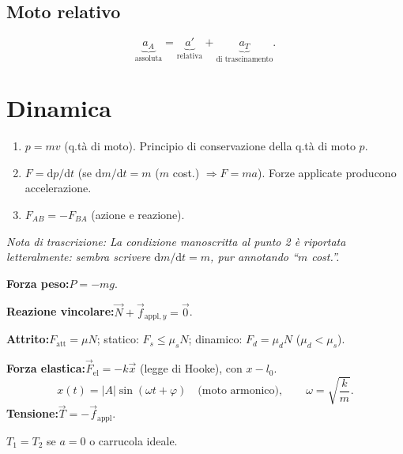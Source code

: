 \documentclass[a4paper,11pt]{article}
\newcommand{\orig}[1]{\clearpage}
\newcommand{\nota}[1]{\par\small\textit{Nota di trascrizione: #1}\par\normalsize}
\newcommand{\vv}[1]{\vec{#1}}
\newcommand{\dd}{\mathrm{d}}
\begin{document}
\orig{3}
\subsection*{Moto relativo}
\[\underbrace{a_A}_{\text{assoluta}}=\underbrace{a'}_{\text{relativa}}+\underbrace{a_T}_{\text{di trascinamento}}.\]
\section*{Dinamica}
\begin{enumerate}
\item $p=mv$ (q.tà di moto). Principio di conservazione della q.tà di moto $p$.
\item $F=\dd p/\dd t$ (se $\dd m/\dd t=m$ ($m$ cost.) $\Rightarrow F=ma$). Forze applicate producono accelerazione.
\item $F_{AB}=-F_{BA}$ (azione e reazione).
\end{enumerate}
\nota{La condizione manoscritta al punto 2 è riportata letteralmente: sembra scrivere $\dd m/\dd t=m$, pur annotando ``$m$ cost.''.}
\textbf{Forza peso:}\quad $P=-mg$.

\textbf{Reazione vincolare:}\quad $\vv N+\vv f_{\mathrm{appl},y}=\vv0$.
\begin{center}\end{center}
\textbf{Attrito:}\quad $F_{\mathrm{att}}=\mu N$;
statico: $F_s\leq\mu_sN$; dinamico: $F_d=\mu_dN$ ($\mu_d<\mu_s$).

\textbf{Forza elastica:}\quad $\vv F_{\mathrm{el}}=-k\vv x$ (legge di Hooke), con $x-l_0$.
\[x(t)=|A|\sin(\omega t+\varphi)\quad\text{(moto armonico)},\qquad \omega=\sqrt{\frac km}.\]
\textbf{Tensione:}\quad $\vv T=-\vv f_{\mathrm{appl}}$.
\begin{center}\end{center}
$T_1=T_2$ se $a=0$ o carrucola ideale.
\end{document}
